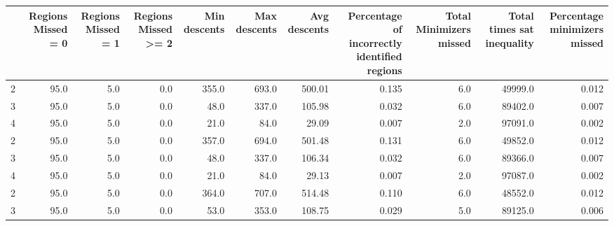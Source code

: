 \begin{tabular}{lrrrrrrrrrr}
\toprule
{} &  Regions Missed = 0 &  Regions Missed = 1 &  Regions Missed >= 2 &  Min descents &  Max descents &  Avg descents &  Percentage of incorrectly identified regions &  Total Minimizers missed &  Total times sat inequality &  Percentage minimizers missed \\
\midrule
2 &                95.0 &                 5.0 &                  0.0 &         355.0 &         693.0 &        500.01 &                                         0.135 &                      6.0 &                     49999.0 &                         0.012 \\
3 &                95.0 &                 5.0 &                  0.0 &          48.0 &         337.0 &        105.98 &                                         0.032 &                      6.0 &                     89402.0 &                         0.007 \\
4 &                95.0 &                 5.0 &                  0.0 &          21.0 &          84.0 &         29.09 &                                         0.007 &                      2.0 &                     97091.0 &                         0.002 \\
2 &                95.0 &                 5.0 &                  0.0 &         357.0 &         694.0 &        501.48 &                                         0.131 &                      6.0 &                     49852.0 &                         0.012 \\
3 &                95.0 &                 5.0 &                  0.0 &          48.0 &         337.0 &        106.34 &                                         0.032 &                      6.0 &                     89366.0 &                         0.007 \\
4 &                95.0 &                 5.0 &                  0.0 &          21.0 &          84.0 &         29.13 &                                         0.007 &                      2.0 &                     97087.0 &                         0.002 \\
2 &                95.0 &                 5.0 &                  0.0 &         364.0 &         707.0 &        514.48 &                                         0.110 &                      6.0 &                     48552.0 &                         0.012 \\
3 &                95.0 &                 5.0 &                  0.0 &          53.0 &         353.0 &        108.75 &                                         0.029 &                      5.0 &                     89125.0 &                         0.006 \\

\end{tabular}
